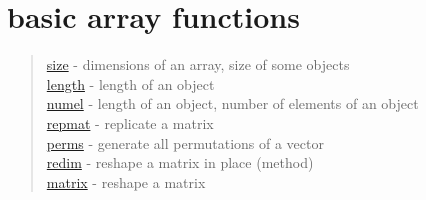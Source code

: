 \chapter*{basic array functions}

\begin{quote}
\noindent
\hyperlink{size}{size} - dimensions of an array, size of some objects \\
\hyperlink{length}{length} - length of an object  \\
\hyperlink{numel}{numel} - length of an object, number of elements of an object  \\
\hyperlink{repmat}{repmat} - replicate a matrix\\
\hyperlink{perms}{perms} - generate all permutations of a vector\\
\hyperlink{redim}{redim} - reshape a matrix in place (method)\\
\hyperlink{matrix}{matrix} - reshape a matrix\\
\end{quote}

%





